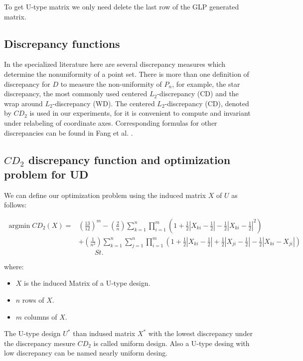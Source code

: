 \documentclass[a4paper,10pt]{llncs}
\begin{document}
To get U-type matrix we only need delete the last row of the GLP generated matrix.

\subsection{Discrepancy functions}

In the specialized literature here are several discrepancy measures which determine the nonuniformity of a point set. There is more than one definition of discrepancy for $D$ to measure the
non-uniformity of $P_n$, for example, the star discrepancy, the most commonly used centered $L_2$-discrepancy (CD) and the wrap around $L_2$-discrepancy (WD). The centered $L_2$-discrepancy (CD),
denoted by $CD_2$ is used in our experiments, for it is convenient to compute and invariant under relabeling of coordinate axes. Corresponding formulas for other discrepancies can be found in Fang et al. \cite{fang2003j}.

\subsection{$CD_2$ discrepancy function and optimization problem for UD}

We can define our optimization problem using the induced matrix $X$ of $U$ as follows:

\begin{eqnarray}
\mathop{\mathrm{argmin}} CD_2(X) =& \left(\frac{13}{12}\right)^m - \left(\frac{2}{n}\right) \sum_{k=1}^n \prod_{i=1}^m \left(1+\frac{1}{2} |X_{ki}-\frac{1}{2}| - \frac{1}{2} |X_{ki}-\frac{1}{2}|^2  \right)& \\
& + \left(\frac{1}{n^2}\right) \sum_{k=1}^n \sum_{j=1}^n \prod_{i=1}^m \left(1+\frac{1}{2} |X_{ki}-\frac{1}{2}| + \frac{1}{2} |X_{ji}-\frac{1}{2}| - \frac{1}{2} |X_{ki}-X_{ji}| \right)& \nonumber 
\end{eqnarray}
 $\quad \quad \quad \quad \quad \quad \quad \quad \quad \quad \quad \quad \quad St.$ %

 where:
 \begin{itemize}
  \item $X$ is the induced Matrix of a U-type design.
  \item $n$ rows of $X$.
  \item $m$ columns of $X$.
 \end{itemize}

The U-type design $U^*$ than indused matrix $X^*$ with the lowest discrepancy under the discrepancy mesure $CD_2$ is called uniform design.  Also a U-type desing with low discrepancy can be named nearly uniform desing\cite{ma2004new}.
 
\end{document}
